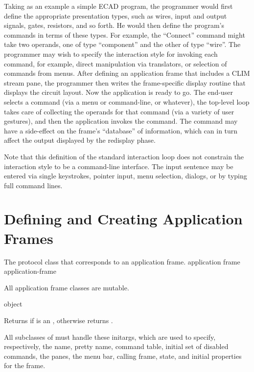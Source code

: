 Taking as an example a simple ECAD program, the programmer would first define
the appropriate presentation types, such as wires, input and output signals,
gates, resistors, and so forth.  He would then define the program's commands in
terms of these types.  For example, the ``Connect'' command might take two
operands, one of type ``component'' and the other of type ``wire''.  The
programmer may wish to specify the interaction style for invoking each command,
for example, direct manipulation via translators, or selection of commands from
menus.  After defining an application frame that includes a CLIM stream pane,
the programmer then writes the frame-specific display routine that displays the
circuit layout.  Now the application is ready to go.  The end-user selects a
command (via a menu or command-line, or whatever), the top-level loop takes care
of collecting the operands for that command (via a variety of user gestures),
and then the application invokes the command.  The command may have a
side-effect on the frame's ``database'' of information, which can in turn affect
the output displayed by the redisplay phase.

Note that this definition of the standard interaction loop does not constrain
the interaction style to be a command-line interface.  The input sentence may be
entered via single keystrokes, pointer input, menu selection, dialogs, or by
typing full command lines.


\section {Defining and Creating Application Frames}


The protocol class that corresponds to an application frame.
 {application frame} {application-frame}

All application frame classes are mutable.

 {object}

Returns  if  is an , otherwise
returns .


All subclasses of  must handle these initargs, which are
used to specify, respectively, the name, pretty name, command table, initial set
of disabled commands, the panes, the menu bar, calling frame, state, and initial
properties for the frame.

